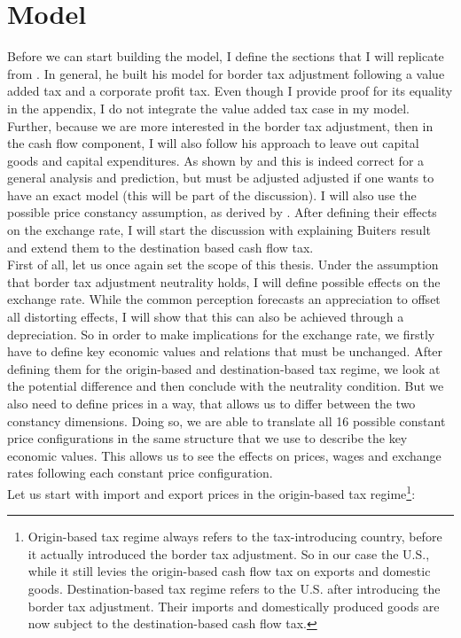 \section{Model}
Before we can start building the model, I define the sections that I will replicate from \cite{buiter2017exchange}. In general, he built his model for border tax adjustment following a value added tax and a corporate profit tax. Even though I provide proof for its equality in the appendix, I do not integrate the value added tax case in my model. 
Further, because we are more interested in the border tax adjustment, then in the cash flow component, I will also follow his approach to leave out capital goods and capital expenditures. As shown by \cite{barbiero2018macroeconomics} and \cite{gopinath2017macroeconomic} this is indeed correct for a general analysis and prediction, but must be adjusted adjusted if one wants to have an exact model (this will be part of the discussion). I will also use the possible price constancy assumption, as derived by \cite{buiter2017exchange}. After defining their effects on the exchange rate, I will start the discussion with explaining Buiters result and extend them to the destination based cash flow tax. \\
First of all, let us once again set the scope of this thesis. Under the assumption that border tax adjustment neutrality holds, I will define possible effects on the exchange rate.   While the common perception forecasts an appreciation to offset all distorting effects, I will show that this can also be achieved through a depreciation. So in order to make implications for the exchange rate, we firstly have to define key economic values and relations that must be unchanged. After defining them for the origin-based and destination-based tax regime, we look at the potential difference and then conclude with the neutrality condition. 
But we also need to define prices in a way, that allows us to differ between the two constancy dimensions. Doing so, we are able to translate all 16 possible constant price configurations in the same structure that we use to describe the key economic values. This allows us to see the effects on prices, wages and exchange rates following each constant price configuration.\\
Let us start with import and export prices in the origin-based tax regime\footnote{Origin-based tax regime always refers to the tax-introducing country, before it actually introduced the border tax adjustment. So in our case the U.S., while it still levies the origin-based cash flow tax on exports and domestic goods. Destination-based tax regime refers to the U.S. after introducing the border tax adjustment. Their imports and domestically produced goods are now subject to the destination-based cash flow tax.}:

